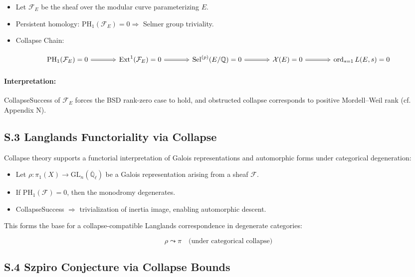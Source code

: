 \documentclass[11pt]{article}
\DeclareMathOperator{\Sel}{Sel}
\newcommand{\Sha}{\mathcal{X}}
\begin{document}
\begin{itemize}
  \item Let \( \mathcal{F}_E \) be the sheaf over the modular curve parameterizing \( E \).
  \item Persistent homology: \( \mathrm{PH}_1(\mathcal{F}_E) = 0 \Rightarrow \) Selmer group triviality.
  \item Collapse Chain:
\end{itemize}

\[
\begin{tikzcd}[row sep=large, column sep=large]
\mathrm{PH}_1(\mathcal{F}_E) = 0
\arrow[r, Rightarrow] & \mathrm{Ext}^1(\mathcal{F}_E) = 0
\arrow[r, Rightarrow] & \Sel^{(p)}(E/\mathbb{Q}) = 0
\arrow[r, Rightarrow] & \Sha(E) = 0
\arrow[r, Rightarrow] & \operatorname{ord}_{s=1} L(E,s) = 0
\end{tikzcd}
\]

\paragraph{Interpretation:} CollapseSuccess of \( \mathcal{F}_E \) forces the BSD rank-zero case to hold, and obstructed collapse corresponds to positive Mordell–Weil rank (cf. Appendix N).

\subsection*{S.3 Langlands Functoriality via Collapse}

Collapse theory supports a functorial interpretation of Galois representations and automorphic forms under categorical degeneration:

\begin{itemize}
  \item Let \( \rho: \pi_1(X) \to \mathrm{GL}_n(\overline{\mathbb{Q}}_\ell) \) be a Galois representation arising from a sheaf \( \mathcal{F} \).
  \item If \( \mathrm{PH}_1(\mathcal{F}) = 0 \), then the monodromy degenerates.
  \item CollapseSuccess \( \Rightarrow \) trivialization of inertia image, enabling automorphic descent.
\end{itemize}

This forms the base for a collapse-compatible Langlands correspondence in degenerate categories:

\[
\rho \leadsto \pi \quad \text{(under categorical collapse)}
\]

\subsection*{S.4 Szpiro Conjecture via Collapse Bounds}
\end{document}
